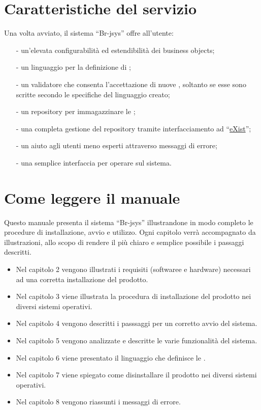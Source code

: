 \section{Caratteristiche del servizio}
Una volta avviato, il sistema ``Br-jsys'' offre all'utente:
\begin{itemize}
\item[-] un'elevata configurabilit\`a ed estendibilit\`a dei business objects;
\item[-] un linguaggio per la definizione di \br;
\item[-] un validatore che consenta l'accettazione di nuove \br, soltanto se esse sono scritte secondo le specifiche del linguaggio creato;
\item[-] un repository per immagazzinare le \br;
\item[-] una completa gestione del repository tramite interfacciamento ad ``\underline{eXist}'';
\item[-] un aiuto agli utenti meno esperti attraverso  messaggi di errore;
\item[-] una semplice interfaccia per operare sul sistema.
\end{itemize}

\section{Come leggere il manuale}
 Questo manuale presenta il sistema ``Br-jsys'' illustrandone in modo completo le procedure di installazione, avvio e utilizzo. 
Ogni capitolo verr\`a accompagnato da illustrazioni, allo scopo di rendere il pi\`u chiaro e semplice possibile i passaggi descritti.
 \begin{itemize}
 \item Nel capitolo 2 vengono illustrati i requisiti (softwaree e hardware) necessari ad una corretta installazione del prodotto.
\item Nel capitolo 3 viene illustrata la procedura di installazione del prodotto nei diversi sistemi operativi.
\item Nel capitolo 4 vengono descritti i passsaggi per un corretto avvio del sistema.
\item Nel capitolo 5 vengono analizzate e descritte le varie funzionalit\`a del sistema.
\item Nel capitolo 6 viene presentato il linguaggio che definisce le \br.
\item Nel capitolo 7 viene spiegato come disinstallare il prodotto nei diversi sistemi operativi.
\item Nel capitolo 8 vengono riassunti i messaggi di errore.
 \end{itemize}



